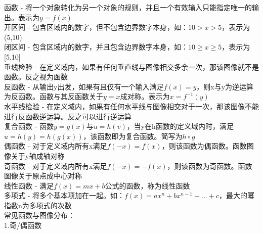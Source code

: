 \documentclass[UTF8,fontset=ubuntu]{ctexart}
\begin{document}
函数 - 将一个对象转化为另一个对象的规则，并且一个有效输入只能指定唯一的输出。表示为$y=f(x)$\\
开区间 - 包含区域内的数字，但不包含边界数字本身，如：$10 > x > 5$，表示为(5,10)\\
闭区间 - 包含区域内的数字，并且包含边界数字本身，如：$10 \geq x \geq 5$，表示为[5,10]\\
垂线检验 - 在定义域内，如果有任何垂直线与图像相交多余一次，那该图像就不是函数。反之视为函数\\
反函数 - 从输出y出发，如果有且仅有一个输入满足$f(x)=y$，则x与y为逆运算为反函数。函数与其反函数关于$y=x$成对称。表示为$x=f^{-1}(y)$\\
水平线检验 - 在定义域内，如果有任何水平线与图像相交对于一次，那该图像不能进行反函数逆运算。反之可以进行逆运算\\
复合函数 - 函数$y=g(x)$与$u=h(v)$，当y在h函数的定义域内时，满足$u=h(y)=h(g(x))$，该函数即为复合函数。简写为$h \circ g$\\
偶函数 - 对于定义域内所有x满足$f(-x)=f(x)$，则该函数为偶函数。函数图像关于y轴成轴对称\\
奇函数 - 对于定义域内所有x满足$f(-x)=-f(x)$，则该函数为奇函数。函数图像关于原点成中心对称\\
线性函数 - 满足$f(x)=mx+b$公式的函数，称为线性函数\\
多项式 - 将多个基本项加在一起。如：$f(x)=ax^n+bx^{n-1}+...+c$，最大的幂指数n为多项式的次数\\
常见函数与图像分布：\\
1.奇/偶函数\\
\begin{figure}[H]
\end{figure}
\end{document}
